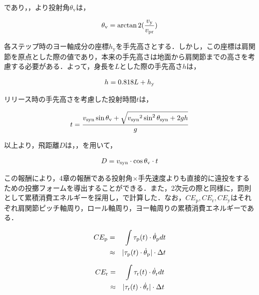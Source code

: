 であり，，より投射角$\theta_{\mathrm{v}}$は，

\begin{eqnarray}
  \equlabel{5.3}
  \theta_{\mathrm{v}} = \arctan2(\frac{v_{\mathrm{y}}}{v_{\mathrm{pr}}})
\end{eqnarray}

各ステップ時のヨー軸成分の座標$h_{\mathrm{y}}$を手先高さとする．しかし，この座標は肩関節を原点とした際の値であり，本来の手先高さは地面から肩関節までの高さを考慮する必要がある．よって，身長を$L$とした際の手先高さ$h$は，

\begin{eqnarray}
  \equlabel{5.4}
  h = 0.818L + h_{\mathrm{y}}
\end{eqnarray}

リリース時の手先高さを考慮した投射時間$t$は，

\begin{eqnarray}
  \equlabel{5.5}
  t = \frac{v_{\mathrm{syn}}\sin\theta_{\mathrm{v}} + \sqrt{{v_{\mathrm{syn}}}^2\sin^2\theta_{\mathrm{syn}} + 2gh}}{g}
\end{eqnarray}


以上より，飛距離$D$は，，を用いて，

\begin{eqnarray}
  \equlabel{5.6}
  D = v_{\mathrm{syn}} \cdot \cos\theta_{\mathrm{v}} \cdot t
\end{eqnarray}

この報酬により，4章の報酬である投射角$\times$手先速度よりも直接的に遠投をするための投擲フォームを導出することができる．また，2次元の際と同様に，罰則として累積消費エネルギーを採用し，で計算した．なお，$CE_{\mathrm{p}},CE_{\mathrm{r}},CE_{\mathrm{y}}$はそれぞれ肩関節ピッチ軸周り，ロール軸周り，ヨー軸周りの累積消費エネルギーである．

\begin{eqnarray}
  \equlabel{5.7}
  CE_{\mathrm{p}}&=&\int \tau_{\mathrm{p}}(t)\cdot\dot{\theta}_{\mathrm{p}} dt\\
        &\approx&|\tau_{\mathrm{p}}(t)\cdot\dot{\theta}_{\mathrm{p}}|\cdot\Delta t
\end{eqnarray}

\begin{eqnarray}
  \equlabel{5.8}
  CE_{\mathrm{r}}&=&\int \tau_{\mathrm{r}}(t)\cdot\dot{\theta}_{\mathrm{r}} dt\\
        &\approx&|\tau_{\mathrm{r}}(t)\cdot\dot{\theta}_{\mathrm{r}}|\cdot\Delta t
\end{eqnarray}

